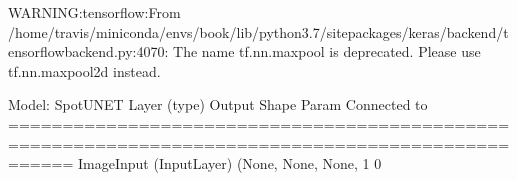 \documentclass[letterpaper,10pt,english]{sphinxmanual}
\begin{document}
\begin{sphinxVerbatim}[commandchars=\\\{\}]
WARNING:tensorflow:From /home/travis/miniconda/envs/book/lib/python3.7/site\PYGZhy{}packages/keras/backend/tensorflow\PYGZus{}backend.py:4070: The name tf.nn.max\PYGZus{}pool is deprecated. Please use tf.nn.max\PYGZus{}pool2d instead.
\end{sphinxVerbatim}

\begin{sphinxVerbatim}[commandchars=\\\{\}]
Model: \PYGZdq{}SpotUNET\PYGZdq{}
\PYGZus{}\PYGZus{}\PYGZus{}\PYGZus{}\PYGZus{}\PYGZus{}\PYGZus{}\PYGZus{}\PYGZus{}\PYGZus{}\PYGZus{}\PYGZus{}\PYGZus{}\PYGZus{}\PYGZus{}\PYGZus{}\PYGZus{}\PYGZus{}\PYGZus{}\PYGZus{}\PYGZus{}\PYGZus{}\PYGZus{}\PYGZus{}\PYGZus{}\PYGZus{}\PYGZus{}\PYGZus{}\PYGZus{}\PYGZus{}\PYGZus{}\PYGZus{}\PYGZus{}\PYGZus{}\PYGZus{}\PYGZus{}\PYGZus{}\PYGZus{}\PYGZus{}\PYGZus{}\PYGZus{}\PYGZus{}\PYGZus{}\PYGZus{}\PYGZus{}\PYGZus{}\PYGZus{}\PYGZus{}\PYGZus{}\PYGZus{}\PYGZus{}\PYGZus{}\PYGZus{}\PYGZus{}\PYGZus{}\PYGZus{}\PYGZus{}\PYGZus{}\PYGZus{}\PYGZus{}\PYGZus{}\PYGZus{}\PYGZus{}\PYGZus{}\PYGZus{}\PYGZus{}\PYGZus{}\PYGZus{}\PYGZus{}\PYGZus{}\PYGZus{}\PYGZus{}\PYGZus{}\PYGZus{}\PYGZus{}\PYGZus{}\PYGZus{}\PYGZus{}\PYGZus{}\PYGZus{}\PYGZus{}\PYGZus{}\PYGZus{}\PYGZus{}\PYGZus{}\PYGZus{}\PYGZus{}\PYGZus{}\PYGZus{}\PYGZus{}\PYGZus{}\PYGZus{}\PYGZus{}\PYGZus{}\PYGZus{}\PYGZus{}\PYGZus{}\PYGZus{}
Layer (type)                    Output Shape         Param \PYGZsh{}     Connected to                     
==================================================================================================
Image\PYGZus{}Input (InputLayer)        (None, None, None, 1 0                                            
\PYGZus{}\PYGZus{}\PYGZus{}\PYGZus{}\PYGZus{}\PYGZus{}\PYGZus{}\PYGZus{}\PYGZus{}\PYGZus{}\PYGZus{}\PYGZus{}\PYGZus{}\PYGZus{}\PYGZus{}\PYGZus{}\PYGZus{}\PYGZus{}\PYGZus{}\PYGZus{}\PYGZus{}\PYGZus{}\PYGZus{}\PYGZus{}\PYGZus{}\PYGZus{}\PYGZus{}\PYGZus{}\PYGZus{}\PYGZus{}\PYGZus{}\PYGZus{}\PYGZus{}\PYGZus{}\PYGZus{}\PYGZus{}\PYGZus{}\PYGZus{}\PYGZus{}\PYGZus{}\PYGZus{}\PYGZus{}\PYGZus{}\PYGZus{}\PYGZus{}\PYGZus{}\PYGZus{}\PYGZus{}\PYGZus{}\PYGZus{}\PYGZus{}\PYGZus{}\PYGZus{}\PYGZus{}\PYGZus{}\PYGZus{}\PYGZus{}\PYGZus{}\PYGZus{}\PYGZus{}\PYGZus{}\PYGZus{}\PYGZus{}\PYGZus{}\PYGZus{}\PYGZus{}\PYGZus{}\PYGZus{}\PYGZus{}\PYGZus{}\PYGZus{}\PYGZus{}\PYGZus{}\PYGZus{}\PYGZus{}\PYGZus{}\PYGZus{}\PYGZus{}\PYGZus{}\PYGZus{}\PYGZus{}\PYGZus{}\PYGZus{}\PYGZus{}\PYGZus{}\PYGZus{}\PYGZus{}\PYGZus{}\PYGZus{}\PYGZus{}\PYGZus{}\PYGZus{}\PYGZus{}\PYGZus{}\PYGZus{}\PYGZus{}\PYGZus{}\PYGZus{}

\end{sphinxVerbatim}
\end{document}
